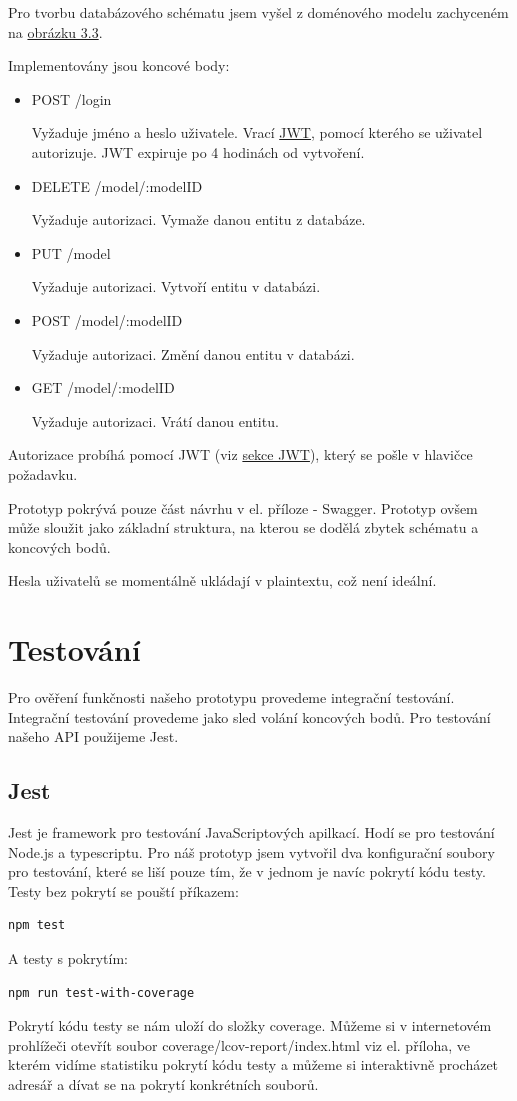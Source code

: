 \documentclass[thesis=B,czech]{FITthesis}[2012/06/26]
\begin{document}
        Pro tvorbu databázového schématu jsem vyšel z doménového modelu zachyceném na \hyperref[fig:domainModel]{obrázku 3.3}.

        Implementovány jsou koncové body:
        \begin{itemize}
            \item POST /login
                
                Vyžaduje jméno a heslo uživatele. Vrací \hyperref[jwt]{JWT}, pomocí kterého se uživatel autorizuje. JWT expiruje po 4 hodinách od vytvoření.
            \item DELETE /model/:modelID
            
                Vyžaduje autorizaci. Vymaže danou entitu z databáze.
            \item PUT /model
            
                Vyžaduje autorizaci. Vytvoří entitu v databázi.
            \item POST /model/:modelID
            
                Vyžaduje autorizaci. Změní danou entitu v databázi.
            \item GET /model/:modelID
            
                Vyžaduje autorizaci. Vrátí danou entitu.
        \end{itemize}

        Autorizace probíhá pomocí JWT (viz \hyperref[jwt]{sekce JWT}), který se pošle v hlavičce požadavku.

        Prototyp pokrývá pouze část návrhu v el. příloze - Swagger. Prototyp ovšem může sloužit jako základní struktura, na kterou se dodělá zbytek schématu a koncových bodů.

        Hesla uživatelů se momentálně ukládají v plaintextu, což není ideální.
\chapter{Testování}
    Pro ověření funkčnosti našeho prototypu provedeme integrační testování. Integrační testování provedeme jako sled volání koncových bodů. Pro testování našeho API použijeme Jest.

    \section{Jest}
        Jest je framework pro testování JavaScriptových apilkací. Hodí se pro testování Node.js a typescriptu.
        Pro náš prototyp jsem vytvořil dva konfigurační soubory pro testování, které se liší pouze tím, že v jednom je navíc pokrytí kódu testy. Testy bez pokrytí se pouští příkazem:
            \begin{verbatim}
npm test
            \end{verbatim}
        A testy s pokrytím:
            \begin{verbatim}
npm run test-with-coverage
            \end{verbatim}
        Pokrytí kódu testy se nám uloží do složky coverage. Můžeme si v internetovém prohlížeči otevřít soubor coverage/lcov-report/index.html viz el. příloha, ve kterém vidíme statistiku pokrytí kódu testy a můžeme si interaktivně procházet adresář a dívat se na pokrytí konkrétních souborů.
\end{document}

